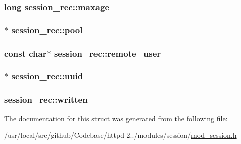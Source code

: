 \subsubsection[{\texorpdfstring{maxage}{maxage}}]{\setlength{\rightskip}{0pt plus 5cm}long session\+\_\+rec\+::maxage}\hypertarget{structsession__rec_abdcb14b183b02e3855766964e9967043}{}\label{structsession__rec_abdcb14b183b02e3855766964e9967043}
\subsubsection[{\texorpdfstring{pool}{pool}}]{$\ast$ session\+\_\+rec\+::pool}\hypertarget{structsession__rec_a3caa374176da90fd14e7c1ea6faeba62}{}\label{structsession__rec_a3caa374176da90fd14e7c1ea6faeba62}
\subsubsection[{\texorpdfstring{remote\+\_\+user}{remote_user}}]{\setlength{\rightskip}{0pt plus 5cm}const char$\ast$ session\+\_\+rec\+::remote\+\_\+user}\hypertarget{structsession__rec_a59c801dd4298d4714e0cdf22482c94ed}{}\label{structsession__rec_a59c801dd4298d4714e0cdf22482c94ed}
\subsubsection[{\texorpdfstring{uuid}{uuid}}]{$\ast$ session\+\_\+rec\+::uuid}\hypertarget{structsession__rec_a74e24cb5d55803cad5c6a378edce7780}{}\label{structsession__rec_a74e24cb5d55803cad5c6a378edce7780}
\subsubsection[{\texorpdfstring{written}{written}}]{ session\+\_\+rec\+::written}\hypertarget{structsession__rec_a446d4da0ca8ae461bc9b18b322c1c8bc}{}\label{structsession__rec_a446d4da0ca8ae461bc9b18b322c1c8bc}


The documentation for this struct was generated from the following file\+:\begin{DoxyCompactItemize}
\item 
/usr/local/src/github/\+Codebase/httpd-\/2../modules/session/\hyperlink{mod__session_8h}{mod\+\_\+session.\+h}\end{DoxyCompactItemize}
